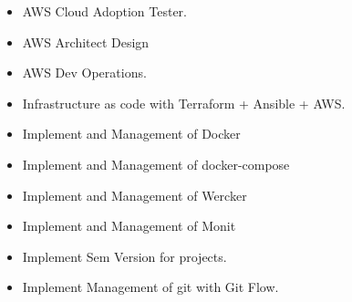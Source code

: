 \documentclass[10pt,a4paper]{altacv}
\begin{document}
\divider

\begin{itemize}
    \item AWS Cloud Adoption Tester.
    \item AWS Architect Design
    \item AWS Dev Operations.
    \item Infrastructure as code with Terraform + Ansible + AWS.
    \item Implement and Management of Docker
    \item Implement and Management of docker-compose
    \item Implement and Management of Wercker
    \item Implement and Management of Monit
    \item Implement Sem Version for projects.
    \item Implement Management of git with Git Flow.
\end{itemize}

\divider
\end{document}
